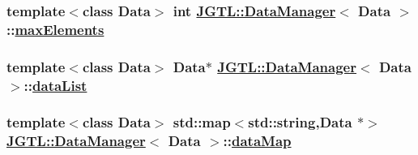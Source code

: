 \hypertarget{class_j_g_t_l_1_1_data_manager_aa1a49e57505b0542e99dbaeda22b2e9}{
\subsubsection[maxElements]{\setlength{\rightskip}{0pt plus 5cm}template$<$class Data$>$ int \hyperlink{class_j_g_t_l_1_1_data_manager}{JGTL::Data\-Manager}$<$ Data $>$::\hyperlink{class_j_g_t_l_1_1_data_manager_aa1a49e57505b0542e99dbaeda22b2e9}{max\-Elements}}}
\label{class_j_g_t_l_1_1_data_manager_aa1a49e57505b0542e99dbaeda22b2e9}


\hypertarget{class_j_g_t_l_1_1_data_manager_2b20ba5251d89c1daeb92f4566c3d8cc}{
\subsubsection[dataList]{\setlength{\rightskip}{0pt plus 5cm}template$<$class Data$>$ Data$\ast$ \hyperlink{class_j_g_t_l_1_1_data_manager}{JGTL::Data\-Manager}$<$ Data $>$::\hyperlink{class_j_g_t_l_1_1_data_manager_2b20ba5251d89c1daeb92f4566c3d8cc}{data\-List}}}
\label{class_j_g_t_l_1_1_data_manager_2b20ba5251d89c1daeb92f4566c3d8cc}


\hypertarget{class_j_g_t_l_1_1_data_manager_871994eebcabe5b6c8f4565561d09004}{
\subsubsection[dataMap]{\setlength{\rightskip}{0pt plus 5cm}template$<$class Data$>$ std::map$<$std::string,Data $\ast$$>$ \hyperlink{class_j_g_t_l_1_1_data_manager}{JGTL::Data\-Manager}$<$ Data $>$::\hyperlink{class_j_g_t_l_1_1_data_manager_871994eebcabe5b6c8f4565561d09004}{data\-Map}}}
\label{class_j_g_t_l_1_1_data_manager_871994eebcabe5b6c8f4565561d09004}


